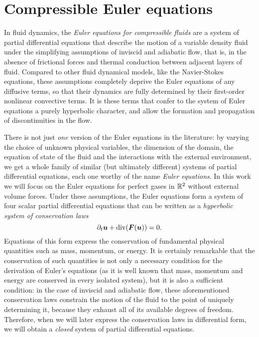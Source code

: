 \graphicspath{{./figures/chapter1/}}
\lstset{inputpath = ../MATLAB}

\chapter{Compressible Euler equations} \label{ch:euler-equations}

In fluid dynamics, the \emph{Euler equations for compressible fluids} are
a system of partial differential equations that describe the motion of a
variable density fluid under the simplifying assumptions of inviscid and
adiabatic flow, that is, in the absence of frictional forces
and thermal conduction between adjacent layers of fluid.
Compared to other fluid dynamical models, like the Navier-Stokes
equations, these assumptions completely deprive the Euler equations
of any diffusive terms, so that their dynamics are fully determined
by their first-order nonlinear convective terms.
It is these terms that confer to the system of Euler equations
a purely hyperbolic character, and allow the formation
and propagation of discontinuities in the flow.

There is not just \emph{one} version of the Euler equations in the
literature: by varying the choice of unknown physical variables,
the dimension of the domain, the equation of state of the fluid
and the interactions with the external environment, we get a whole
family of similar (but ultimately different) systems of partial
differential equations, each one worthy of the name \emph{Euler equations}.
In this work we will focus on the Euler equations for perfect
gases in $\mathbb{R}^2$ without external volume forces.
Under these assumptions, the Euler equations form a system of four
scalar partial differential equations that can be written as a
\emph{hyperbolic system of conservation laws}
\begin{equation} \label{eq:sistema-iperbolico-di-leggi-di-conservazione}
\partial_t \bm{u} + \operatorname{div}(\bm{F}(\bm{u})) = 0.
\end{equation}
Equations of this form express the conservation of fundamental physical
quantities such as mass, momentum, or energy. It is certainly remarkable
that the conservation of such quantities is not only a necessary condition
for the derivation of Euler's equations (as it is well known that
mass, momentum and energy are conserved in every isolated system), but
it is also a sufficient condition: in the case of inviscid and adiabatic
flow, these aforementioned conservation laws constrain the motion of
the fluid to the point of uniquely determining it, because
they exhaust all of its available degrees of freedom.
Therefore, when we will later express the conservation laws in differential
form, we will obtain a \emph{closed} system of partial differential equations.


